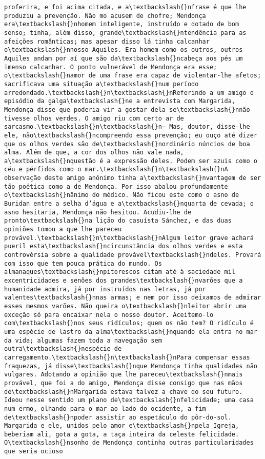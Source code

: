 \begin{Verbatim}[commandchars=\\\{\}]
proferira, e foi acima citada, e a\textbackslash{}nfrase é que lhe produziu a prevenção. Não mo acusem de chofre; Mendonça era\textbackslash{}nhomem inteligente, instruído e dotado de bom senso; tinha, além disso, grande\textbackslash{}ntendência para as afeições românticas; mas apesar disso lá tinha calcanhar o\textbackslash{}nnosso Aquiles. Era homem como os outros, outros Aquiles andam por aí que são da\textbackslash{}ncabeça aos pés um imenso calcanhar. O ponto vulnerável de Mendonça era esse; o\textbackslash{}namor de uma frase era capaz de violentar-lhe afetos; sacrificava uma situação a\textbackslash{}num período arredondado.\textbackslash{}n\textbackslash{}nReferindo a um amigo o episódio da galga\textbackslash{}ne a entrevista com Margarida, Mendonça disse que poderia vir a gostar dela se\textbackslash{}nnão tivesse olhos verdes. O amigo riu com certo ar de sarcasmo.\textbackslash{}n\textbackslash{}n— Mas, doutor, disse-lhe ele, não\textbackslash{}ncompreendo essa prevenção; eu ouço até dizer que os olhos verdes são de\textbackslash{}nordinário núncios de boa alma. Além de que, a cor dos olhos não vale nada, a\textbackslash{}nquestão é a expressão deles. Podem ser azuis como o céu e pérfidos como o mar.\textbackslash{}n\textbackslash{}nA observação deste amigo anônimo tinha a\textbackslash{}nvantagem de ser tão poética como a de Mendonça. Por isso abalou profundamente o\textbackslash{}nânimo do médico. Não ficou este como o asno de Buridan entre a selha d’água e a\textbackslash{}nquarta de cevada; o asno hesitaria, Mendonça não hesitou. Acudiu-lhe de pronto\textbackslash{}na lição do casuísta Sánchez, e das duas opiniões tomou a que lhe pareceu provável.\textbackslash{}n\textbackslash{}nAlgum leitor grave achará pueril esta\textbackslash{}ncircunstância dos olhos verdes e esta controvérsia sobre a qualidade provável\textbackslash{}ndeles. Provará com isso que tem pouca prática do mundo. Os almanaques\textbackslash{}npitorescos citam até à saciedade mil excentricidades e senões dos grandes\textbackslash{}nvarões que a humanidade admira, já por instruídos nas letras, já por valentes\textbackslash{}nnas armas; e nem por isso deixamos de admirar esses mesmos varões. Não queira o\textbackslash{}nleitor abrir uma exceção só para encaixar nela o nosso doutor. Aceitemo-lo com\textbackslash{}nos seus ridículos; quem os não tem? O ridículo é uma espécie de lastro da alma\textbackslash{}nquando ela entra no mar da vida; algumas fazem toda a navegação sem outra\textbackslash{}nespécie de carregamento.\textbackslash{}n\textbackslash{}nPara compensar essas fraquezas, já disse\textbackslash{}nque Mendonça tinha qualidades não vulgares. Adotando a opinião que lhe pareceu\textbackslash{}nmais provável, que foi a do amigo, Mendonça disse consigo que nas mãos de\textbackslash{}nMargarida estava talvez a chave do seu futuro. Ideou nesse sentido um plano de\textbackslash{}nfelicidade; uma casa num ermo, olhando para o mar ao lado do ocidente, a fim de\textbackslash{}npoder assistir ao espetáculo do pôr-do-sol. Margarida e ele, unidos pelo amor e\textbackslash{}npela Igreja, beberiam ali, gota a gota, a taça inteira da celeste felicidade. O\textbackslash{}nsonho de Mendonça continha outras particularidades que seria ocioso 
\end{Verbatim}
